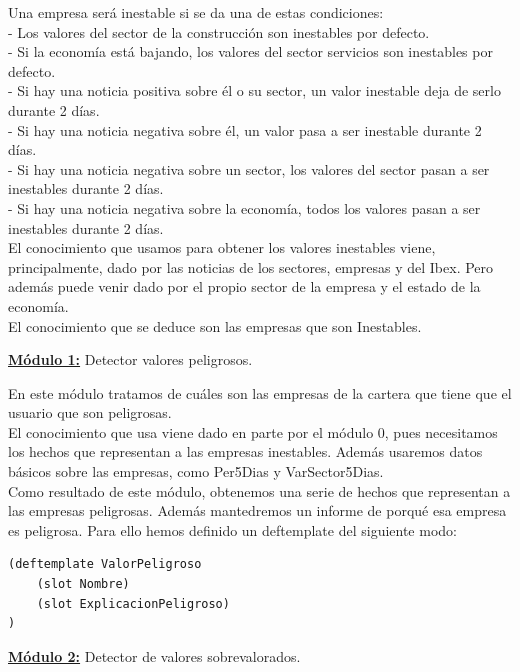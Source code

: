 \documentclass[12pt]{article}
\begin{document}
Una empresa será inestable si se da una de estas condiciones:\\
- Los valores del sector de la construcción son inestables por defecto.\\
- Si la economía está bajando, los valores del sector servicios son inestables por defecto.\\
- Si hay una noticia positiva sobre él o su sector, un valor inestable deja de serlo durante 2 días.\\
- Si hay una noticia negativa sobre él, un valor pasa a ser inestable durante 2 días.\\
- Si hay una noticia negativa sobre un sector, los valores del sector pasan a ser inestables durante 2 días.\\
- Si hay una noticia negativa sobre la economía, todos los valores pasan a ser inestables durante 2 días.\\

El conocimiento que usamos para obtener los valores inestables viene, principalmente, dado por las noticias de los sectores, empresas y del Ibex. Pero además puede venir dado por el propio sector de la empresa y el estado de la economía.\\

El conocimiento que se deduce son las empresas que son Inestables. 

\newpage
\begin{center}
	\underline{\textbf{Módulo 1:}} Detector valores peligrosos.
\end{center}

En este módulo tratamos de cuáles son las empresas de la cartera que tiene que el usuario que son peligrosas. \\

El conocimiento que usa viene dado en parte por el módulo 0, pues necesitamos los hechos que representan a las empresas inestables. Además usaremos datos básicos sobre las empresas, como Per5Dias y VarSector5Dias. \\

Como resultado de este módulo, obtenemos una serie de hechos que representan a las empresas peligrosas. Además mantedremos un informe de porqué esa empresa es peligrosa. Para ello hemos definido un deftemplate del siguiente modo:
\begin{lstlisting}
(deftemplate ValorPeligroso
	(slot Nombre)
	(slot ExplicacionPeligroso)
)
\end{lstlisting}


\begin{center}
	\underline{\textbf{Módulo 2:}} Detector de valores sobrevalorados.
\end{center}
\end{document}
